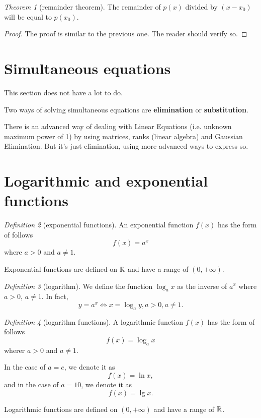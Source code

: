 \documentclass[8pt]{article}
\theoremstyle{remark}
\newtheorem{theorem}{Theorem}[section]
\newtheorem{definition}[theorem]{Definition}
\begin{document}
        \begin{theorem}[remainder theorem]
            The remainder of $p(x)$ divided by $(x - x_0)$ will be equal to $p(x_0)$.

            \begin{proof}
                The proof is similar to the previous one. The reader should verify so.
            \end{proof}
        \end{theorem}

    \section{Simultaneous equations}
        
        This section does not have a lot to do.

        Two ways of solving simultaneous equations are \textbf{elimination} or \textbf{substitution}.

        There is an advanced way of dealing with Linear Equations (i.e. unknown maximum power of 1) by using matrices, ranks (linear algebra) and Gaussian Elimination. But it's just elimination, using more advanced ways to express so.
    
    \section{Logarithmic and exponential functions}
        \begin{definition}[exponential functions]
            An exponential function $f(x)$ has the form of follows
            $$
                f(x) = a^x
            $$
            where $a > 0$ and $a \neq 1$.

            Exponential functions are defined on $\mathbb{R}$ and have a range of $(0, +\infty)$.
        \end{definition}

        \begin{definition}[logarithm]
            We define the function $\log_a x$ as the inverse of $a^x$ where $a > 0$, $a \neq 1$. In fact,
            $$
                y = a^x \iff x = \log_a y, a > 0, a \neq 1.
            $$
        \end{definition}

        \begin{definition}[logarithm functions]
            A logarithmic function $f(x)$ has the form of follows
            $$
                f(x) = \log_a x
            $$ 
            wherer $a > 0$ and $a \neq 1$.

            In the case of $a = e$, we denote it as
            $$
                f(x) = \ln x,
            $$
            and in the case of $a = 10$, we denote it as
            $$
                f(x) = \lg x.
            $$

            Logarithmic functions are defined on $(0, +\infty)$ and have a range of $\mathbb{R}$.
        \end{definition}
    
\end{document}
